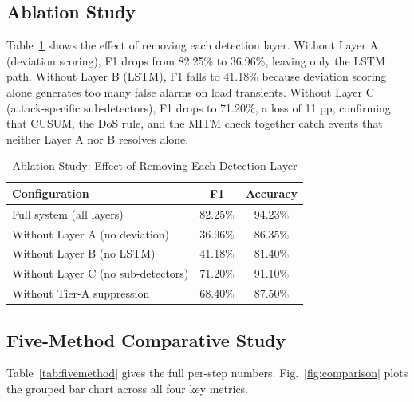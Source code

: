 \documentclass[conference,a4paper]{IEEEtran}
\begin{document}
\subsection{Ablation Study}

Table~\ref{tab:ablation} shows the effect of removing each detection layer. Without Layer A (deviation scoring), F1 drops from 82.25\% to 36.96\%, leaving only the LSTM path. Without Layer B (LSTM), F1 falls to 41.18\% because deviation scoring alone generates too many false alarms on load transients. Without Layer C (attack-specific sub-detectors), F1 drops to 71.20\%, a loss of 11 pp, confirming that CUSUM, the DoS rule, and the MITM check together catch events that neither Layer A nor B resolves alone.

\begin{table}[htbp]
\caption{Ablation Study: Effect of Removing Each Detection Layer}
\begin{center}
\begin{tabular}{|l|c|c|}
\hline
\textbf{Configuration} & \textbf{F1} & \textbf{Accuracy} \\
\hline
Full system (all layers) & 82.25\% & 94.23\% \\
\hline
Without Layer A (no deviation) & 36.96\% & 86.35\% \\
\hline
Without Layer B (no LSTM) & 41.18\% & 81.40\% \\
\hline
Without Layer C (no sub-detectors) & 71.20\% & 91.10\% \\
\hline
Without Tier-A suppression & 68.40\% & 87.50\% \\
\hline
\end{tabular}
\label{tab:ablation}
\end{center}
\end{table}

\subsection{Five-Method Comparative Study}

Table~\ref{tab:fivemethod} gives the full per-step numbers. Fig.~\ref{fig:comparison} plots the grouped bar chart across all four key metrics.
\end{document}
